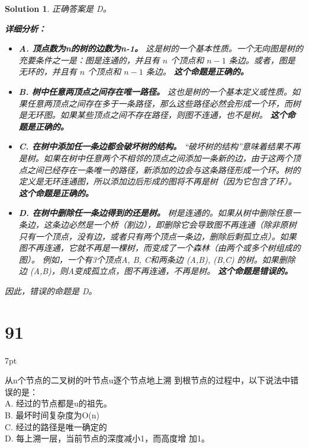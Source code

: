 \documentclass[UTF8]{report}
\newtheorem{solution}{Solution}
\theoremstyle{MyLineTheoremStyle} %
\theoremstyle{MyBlockTheoremStyle} %
\theoremstyle{MySubsubsectionStyle} %
\newenvironment{graybox}{%
        \def\FrameCommand{%
        \hspace{1pt}%
        {\color{gray}\small \vrule width 2pt}%
        {\color{graybox_color}\vrule width 4pt}%
        \colorbox{graybox_color}%
        }%
        \MakeFramed{\advance\hsize-\width\FrameRestore}%
        \noindent\hspace{-4.55pt}%
        \begin{adjustwidth}{}{7pt}%
        \vspace{2pt}\vspace{2pt}%
        }
        {%
        \vspace{2pt}\end{adjustwidth}\endMakeFramed%
        }
\begin{document}
\begin{solution}
正确答案是 D。

\textbf{详细分析：}

\begin{itemize}
    \item \textbf{A. 顶点数为n的树的边数为n-1。}
        这是树的一个基本性质。一个无向图是树的充要条件之一是：图是连通的，并且有 $n$ 个顶点和 $n-1$ 条边。或者，图是无环的，并且有 $n$ 个顶点和 $n-1$ 条边。
        \textbf{这个命题是正确的。}

    \item \textbf{B. 树中任意两顶点之间存在唯一路径。}
        这也是树的一个基本定义或性质。如果任意两顶点之间存在多于一条路径，那么这些路径必然会形成一个环，而树是无环图。如果某些顶点之间不存在路径，则图不连通，也不是树。
        \textbf{这个命题是正确的。}

    \item \textbf{C. 在树中添加任一条边都会破坏树的结构。}
        “破坏树的结构”意味着结果不再是树。如果在树中任意两个不相邻的顶点之间添加一条新的边，由于这两个顶点之间已经存在一条唯一的路径，新添加的边会与这条路径形成一个环。树的定义是无环连通图，所以添加边后形成的图将不再是树（因为它包含了环）。
        \textbf{这个命题是正确的。}

    \item \textbf{D. 在树中删除任一条边得到的还是树。}
        树是连通的。如果从树中删除任意一条边，这条边必然是一个桥（割边），即删除它会导致图不再连通（除非原树只有一个顶点，没有边，或者只有两个顶点一条边，删除后剩孤立点）。如果图不再连通，它就不再是一棵树，而变成了一个森林（由两个或多个树组成的图）。
        例如，一个有3个顶点A, B, C和两条边 (A,B), (B,C) 的树。如果删除边 (A,B)，则A变成孤立点，图不再连通，不再是树。
        \textbf{这个命题是错误的。}
\end{itemize}

因此，错误的命题是 D。
\end{solution}


\section*{91}
\begin{graybox}
从n个节点的二叉树的叶节点u逐个节点地上溯
到根节点的过程中，以下说法中错误的是： \\
A. 经过的节点都是u的祖先。 \\
B. 最坏时间复杂度为O(n) \\
C. 经过的路径是唯一确定的 \\
D. 每上溯一层，当前节点的深度减小1，而高度增
加1。
\end{graybox}
\end{document}
